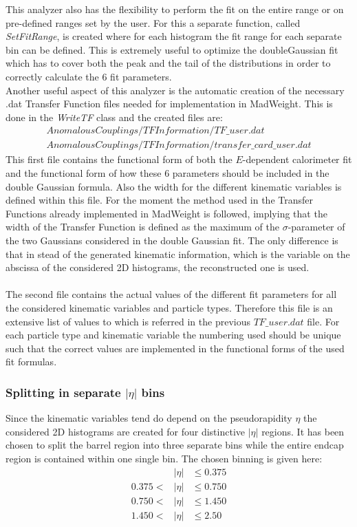 This analyzer also has the flexibility to perform the fit on the entire range or on pre-defined ranges set by the user. For this a separate function, called \textit{SetFitRange}, is created where for each histogram the fit range for each separate bin can be defined. This is extremely useful to optimize the doubleGaussian fit which has to cover both the peak and the tail of the distributions in order to correctly calculate the $6$ fit parameters.\\
Another useful aspect of this analyzer is the automatic creation of the necessary .dat Transfer Function files needed for implementation in MadWeight. This is done in the \textit{WriteTF} class and the created files are:
\begin{eqnarray*}
 AnomalousCouplings/TFInformation/TF\_user.dat \\
 AnomalousCouplings/TFInformation/transfer\_card\_user.dat
\end{eqnarray*}
This first file contains the functional form of both the $E$-dependent calorimeter fit and the functional form of how these $6$ parameters should be included in the double Gaussian formula. Also the width for the different kinematic variables is defined within this file. For the moment the method used in the Transfer Functions already implemented in MadWeight is followed, implying that the width of the Transfer Function is defined as the maximum of the $\sigma$-parameter of the two Gaussians considered in the double Gaussian fit. The only difference is that in stead of the generated kinematic information, which is the variable on the abscissa of the considered 2D histograms, the reconstructed one is used.\\
\\
The second file contains the actual values of the different fit parameters for all the considered kinematic variables and particle types. Therefore this file is an extensive list of values to which is referred in the previous $TF\_user.dat$ file. For each particle type and kinematic variable the numbering used should be unique such that the correct values are implemented in the functional forms of the used fit formulas.

\subsubsection{Splitting in separate $\vert \eta \vert$ bins}
Since the kinematic variables tend do depend on the pseudorapidity $\eta$ the considered 2D histograms are created for four distinctive $\vert \eta \vert$ regions. It has been chosen to split the barrel region into three separate bins while the entire endcap region is contained within one single bin. The chosen binning is given here:
\begin{eqnarray*}
 & \vert \eta \vert & \leq 0.375 \\
 0.375 < & \vert \eta \vert & \leq 0.750 \\
 0.750 < & \vert \eta \vert & \leq 1.450 \\
 1.450 < & \vert \eta \vert & \leq 2.50
\end{eqnarray*}

